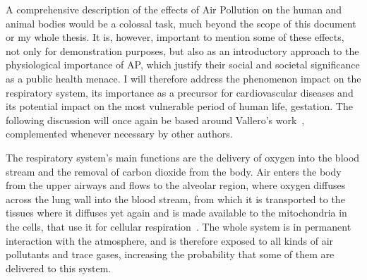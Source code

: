 A comprehensive description of the effects of Air Pollution on the human
and animal bodies would be a colossal task, much beyond the scope of
this document or my whole thesis. It is, however, important to mention
some of these effects, not only for demonstration purposes, but also as
an introductory approach to the physiological importance of \gls{AP},
which justify their social and societal significance as a public health
menace. I will therefore address the phenomenon impact on the
respiratory system, its importance as a precursor for cardiovascular
diseases and its potential impact on the most vulnerable period of human
life, gestation. The following discussion will once again be based
around Vallero's work~\cite{Vallero2014}, complemented whenever
necessary by other authors. 

The respiratory system's main functions are the delivery of oxygen into
the blood stream and the removal of carbon dioxide from the body. Air
enters the body from the upper airways and flows to the alveolar region,
where oxygen diffuses across the lung wall into the blood stream, from
which it is transported to the tissues where it diffuses yet again and
is made available to the mitochondria in the cells, that use it for
cellular respiration~\cite{Nilsson2010}. The whole system
is in permanent interaction with the atmosphere, and is therefore
exposed to all kinds of air pollutants and trace gases, increasing the
probability that some of them are delivered to this system. 

